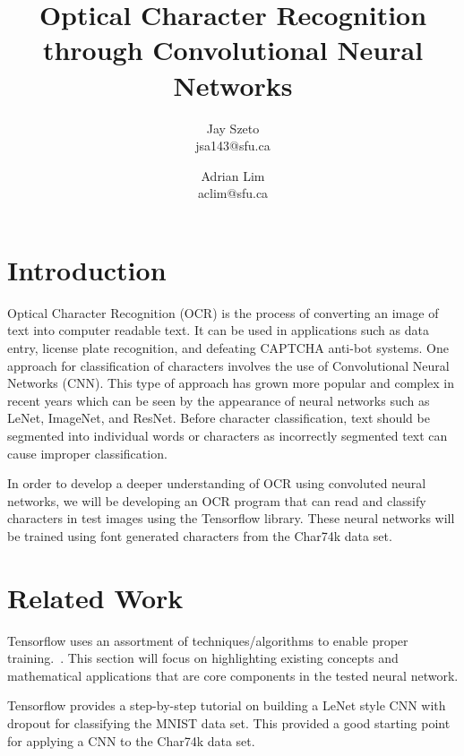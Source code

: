 \documentclass[11pt]{article}
\title{Optical Character Recognition through Convolutional Neural Networks}
\author{Jay Szeto\\ jsa143@sfu.ca \and Adrian Lim\\ aclim@sfu.ca}
\begin{document}
\maketitle

\begin{abstract}
      
\end{abstract}

\hrulefill

\section{Introduction}
    Optical Character Recognition (OCR) is the process of converting an image of text into computer readable text.\cite{ocr_wiki_2017} It can be used in applications such as data entry, license plate recognition, and defeating CAPTCHA anti-bot systems.\cite{ocr_wiki_2017} One approach for classification of characters involves the use of Convolutional Neural Networks (CNN).\cite{lecun_bottou_bengio_haffner_1998} This type of approach has grown more popular and complex in recent years which can be seen by the appearance of neural networks such as LeNet, ImageNet, and ResNet. \cite{lecun_bottou_bengio_haffner_1998, image_net_2012, he2016deep} Before character classification, text should be segmented into individual words or characters as incorrectly segmented text can cause improper classification. \cite{shinde_textpre-processing}
    
    In order to develop a deeper understanding of OCR using convoluted neural networks, we will be developing an OCR program that can read and classify characters in test images using the Tensorflow library. \cite{tensorflow15-whitepaper} These neural networks will be trained using font generated characters from the Char74k data set. \cite{deCampos09}
    
\section{Related Work}
    Tensorflow uses an assortment of techniques/algorithms to enable proper training.~\cite{mnist-for-ml-beginners17}.  This section will focus on highlighting existing concepts and mathematical applications that are core components in the tested neural network.
    
    Tensorflow provides a step-by-step tutorial on building a LeNet style CNN with dropout for classifying the MNIST data set.\cite{tensorflow15-whitepaper, lecun_bottou_bengio_haffner_1998} This provided a good starting point for applying a CNN to the Char74k data set.
\end{document}
